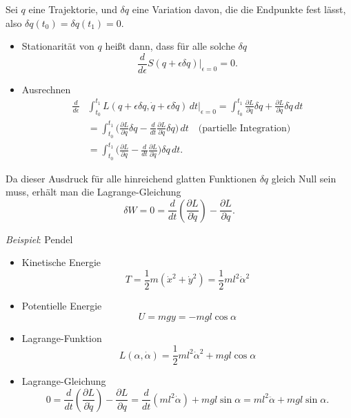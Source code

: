 Sei $q$ eine Trajektorie, und $\delta q$ eine Variation davon, die die Endpunkte fest lässt, also $\delta q(t_0)=\delta q(t_1) = 0$.
\begin{itemize}
	\item Stationarität von $q$ heißt dann, dass für alle solche $\delta q$
	\begin{equation*}
		\frac{d}{d\epsilon} S(q+\epsilon\delta q)\vert_{\epsilon=0} = 0.
	\end{equation*}
	\item Ausrechnen
	\begin{align*}
		\frac{d}{d\epsilon} &\int_{t_0}^{t_1} L(q+ \epsilon\delta q,\dot q + \epsilon\delta \dot q)\,dt\vert_{\epsilon=0} = \int_{t_0}^{t_1} \frac{\partial L}{\partial q}\delta q + \frac{\partial L}{\partial\dot q} \delta\dot q\, dt \\
		&= \int_{t_0}^{t_1} \Bigg(\frac{\partial L}{\partial q} \delta q - \frac{d}{dt} \frac{\partial L}{\partial \dot q} \delta q\Bigg)\,dt \quad\text{(partielle Integration)} \\
		&= \int_{t_0}^{t_1} \Bigg(\frac{\partial L}{\partial q} - \frac{d}{dt} \frac{\partial L}{\partial \dot q}  \Bigg)\delta q\,dt.
	\end{align*}
\end{itemize}
Da dieser Ausdruck für alle hinreichend glatten Funktionen $\delta q$ gleich Null sein muss, erhält man die Lagrange-Gleichung
\begin{equation*}
  \delta W = 0 = \frac{d}{dt} \left( \frac{\partial L}{\partial \dot q} \right) - \frac{\partial L}{\partial q}.
\end{equation*}

\emph{Beispiel}: Pendel

\begin{itemize}
\item Kinetische Energie
  \begin{equation*}
    T = \frac12 m (\dot x^2 + \dot y^2) = \frac12 m l^2 \dot\alpha^2
  \end{equation*}
\item Potentielle Energie
  \begin{equation*}
    U = mgy = -mgl \cos \alpha
  \end{equation*}
\item Lagrange-Funktion
  \begin{equation*}
    L(\alpha, \dot\alpha) = \frac12 m l^2 \dot\alpha^2 + mgl \cos \alpha
  \end{equation*}
\item Lagrange-Gleichung
  \begin{equation*}
    0
    = \frac{d}{dt} \left( \frac{\partial L}{\partial \dot q} \right) - \frac{\partial L}{\partial q}
    = \frac{d}{dt}( ml^2\dot\alpha ) + mgl \sin \alpha
    = ml^2\ddot\alpha + mgl \sin \alpha.
  \end{equation*}
\end{itemize}

